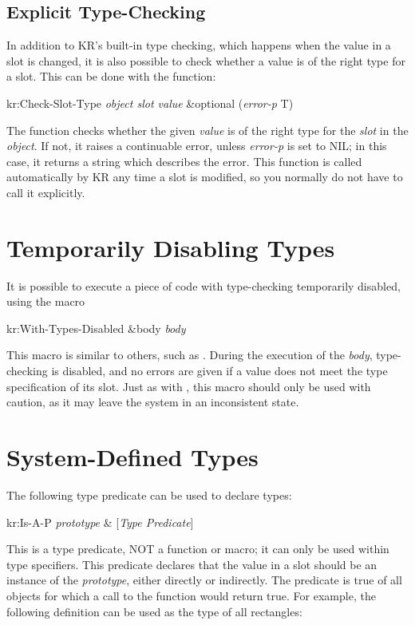 \begin{group}
\section{Explicit Type-Checking}

In addition to KR's built-in type checking, which happens when the
value in a slot is changed, it is also possible to check whether a
value is of the right type for a slot.  This can be done with
the function:
\begin{example}
kr:Check-Slot-Type {\it object slot value} \&optional ({\it error-p} T) \value{function}
\end{example}

The function checks whether the given {\it value} is of the right type
for the {\it slot} in the {\it object}.  If not, it raises a continuable
error, unless {\it error-p} is set to NIL; in this case, it returns a
string which describes the error.  This function is called
automatically by KR any time a slot is modified, so you normally do
not have to call it explicitly.
\end{group}


\section{Temporarily Disabling Types}

It is possible to execute a piece of code with type-checking
temporarily disabled, using the macro
\begin{example}
kr:With-Types-Disabled \&body {\it body} \value{macro}
\end{example}
This macro is similar to others, such as .
During the execution of the {\it body}, type-checking is disabled, and
no errors are given if a value does not meet the type specification of
its slot.  Just as with , this macro should
only be used with caution, as it may leave the system in an
inconsistent state.


\section{System-Defined Types}

The following type predicate can be used to declare types:
\begin{example}
kr:Is-A-P {\it prototype}	 & [{\it Type Predicate}]
\end{example}
This is a type predicate, NOT a function or macro; it can only be
used within type specifiers.  This predicate declares that the value
in a slot should be an instance of the {\it prototype}, either directly
or indirectly.  The predicate is true of all objects for which a call
to the function  would return true.  For example, the
following definition can be used as the type of all rectangles:

